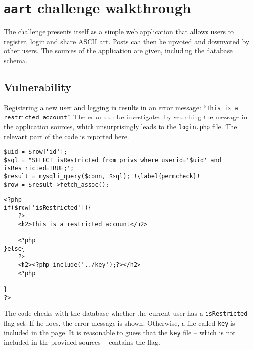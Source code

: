 \section{\texttt{aart} challenge walkthrough}

The challenge presents itself as a simple web application that allows users to register, login and share ASCII art. Posts can then be upvoted and downvoted by other users. The sources of the application are given, including the database schema. \\

\subsection{Vulnerability}
 
Registering a new user and logging in results in an error message: ``\texttt{This is a restricted account}''. The error can be investigated by searching the message in the application sources, which unsurprisingly leads to the \texttt{login.php} file. The relevant part of the code is reported here.

\begin{verbatim}
$uid = $row['id'];
$sql = "SELECT isRestricted from privs where userid='$uid' and isRestricted=TRUE;";
$result = mysqli_query($conn, $sql); !\label{permcheck}!
$row = $result->fetch_assoc();
\end{verbatim}

\vspace{-20pt}
\newenvironment{uglyworkaround}{\par\color{white}}{\par}
\begin{uglyworkaround}
\renewcommand{\theFancyVerbLine}{\rmfamily\textcolor{black}{\tiny{\arabic{FancyVerbLine}}}}
\begin{verbatim}
<?php
if($row['isRestricted']){
    ?>
    <h2>This is a restricted account</h2>

    <?php
}else{
    ?>
    <h2><?php include('../key');?></h2>
    <?php

}
?>
\end{verbatim}
\end{uglyworkaround}

The code checks with the database whether the current user has a \texttt{isRestricted} flag set. If he does, the error message is shown. Otherwise, a file called \texttt{key} is included in the page. It is reasonable to guess that the \texttt{key} file -- which is not included in the provided sources -- contains the flag. \\

